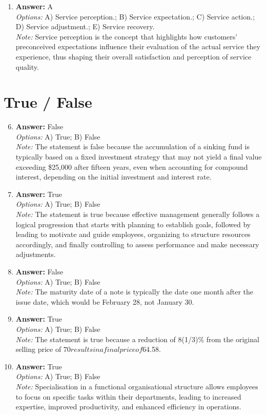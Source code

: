 \documentclass[12pt]{article}
\begin{document}
\begin{enumerate}[label=\arabic*.]
\item \textbf{Answer:} A
\\ \textit{Options:} A) Service perception.; B) Service expectation.; C) Service action.; D) Service adjustment.; E) Service recovery.
\\ \textit{Note:} Service perception is the concept that highlights how customers' preconceived expectations influence their evaluation of the actual service they experience, thus shaping their overall satisfaction and perception of service quality.
\end{enumerate}

\section*{True / False}
\begin{enumerate}[label=\arabic*.]
\setcounter{enumi}{5}
\item \textbf{Answer:} False
\\ \textit{Options:} A) True; B) False
\\ \textit{Note:} The statement is false because the accumulation of a sinking fund is typically based on a fixed investment strategy that may not yield a final value exceeding \$25,000 after fifteen years, even when accounting for compound interest, depending on the initial investment and interest rate.
\item \textbf{Answer:} True
\\ \textit{Options:} A) True; B) False
\\ \textit{Note:} The statement is true because effective management generally follows a logical progression that starts with planning to establish goals, followed by leading to motivate and guide employees, organizing to structure resources accordingly, and finally controlling to assess performance and make necessary adjustments.
\item \textbf{Answer:} False
\\ \textit{Options:} A) True; B) False
\\ \textit{Note:} The maturity date of a note is typically the date one month after the issue date, which would be February 28, not January 30.
\item \textbf{Answer:} True
\\ \textit{Options:} A) True; B) False
\\ \textit{Note:} The statement is true because a reduction of 8(1/3)\% from the original selling price of $70 results in a final price of $64.58.
\item \textbf{Answer:} True
\\ \textit{Options:} A) True; B) False
\\ \textit{Note:} Specialisation in a functional organisational structure allows employees to focus on specific tasks within their departments, leading to increased expertise, improved productivity, and enhanced efficiency in operations.
\end{enumerate}
\end{document}
